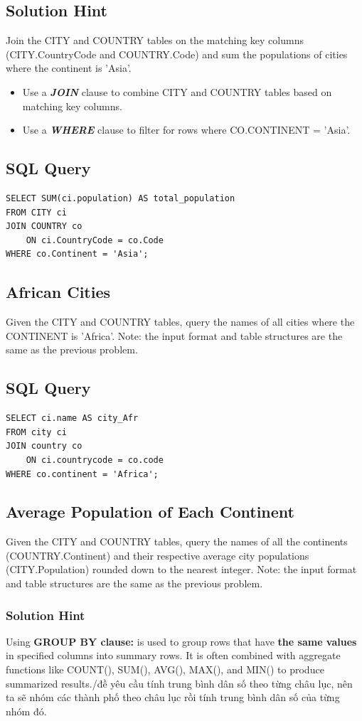 \documentclass[12pt,a4paper]{article}
\begin{document}
\subsection*{Solution Hint}
Join the CITY and COUNTRY tables on the matching key columns (CITY.CountryCode and COUNTRY.Code) and sum the populations of cities where the continent is 'Asia'.
\begin{itemize}
    \item Use a \textit{\textbf{JOIN}} clause to combine CITY and COUNTRY tables based on matching key columns.
    \item Use a \textit{\textbf{WHERE}} clause to filter for rows where CO.CONTINENT = 'Asia'.
\end{itemize}
\subsection*{SQL Query}
\begin{lstlisting}[style=sqlstyle]
SELECT SUM(ci.population) AS total_population
FROM CITY ci
JOIN COUNTRY co
    ON ci.CountryCode = co.Code
WHERE co.Continent = 'Asia';
\end{lstlisting}
\subsection{African Cities}
Given the CITY and COUNTRY tables, query the names of all cities where the CONTINENT is 'Africa'.
\newline
Note: the input format and table structures are the same as the previous problem.
\subsection*{SQL Query}
\begin{lstlisting}[style=sqlstyle]
SELECT ci.name AS city_Afr
FROM city ci
JOIN country co 
    ON ci.countrycode = co.code 
WHERE co.continent = 'Africa';
\end{lstlisting}
\subsection{Average Population of Each Continent}
Given the CITY and COUNTRY tables, query the names of all the continents (COUNTRY.Continent) and their respective average city populations (CITY.Population) rounded down to the nearest integer.
\newline
Note: the input format and table structures are the same as the previous problem.
\subsubsection*{Solution Hint}
Using \textbf{GROUP BY clause:} is used to group rows that have \textbf{the same values} in specified columns into summary rows. It is often combined with aggregate functions like COUNT(), SUM(), AVG(), MAX(), and MIN() to produce summarized results./đề yêu cầu tính trung bình dân số theo từng châu lục, nên ta sẽ nhóm các thành phố theo châu lục rồi tính trung bình dân số của từng nhóm đó.
\end{document}
